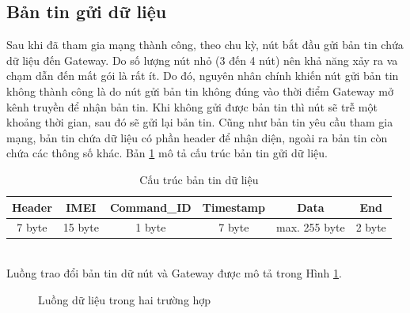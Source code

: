 \subsection{Bản tin gửi dữ liệu}
Sau khi đã tham gia mạng thành công, theo chu kỳ, nút bắt đầu gửi bản tin chứa dữ liệu đến Gateway. Do số lượng nút nhỏ (3 đến 4 nút) nên khả năng xảy ra va chạm dẫn đến mất gói là rất ít. Do đó, nguyên nhân chính khiến nút gửi bản tin không thành công là do nút gửi bản tin không đúng vào thời điểm Gateway mở kênh truyền để nhận bản tin. Khi không gửi được bản tin thì nút sẽ trễ một khoảng thời gian, sau đó sẽ gửi lại bản tin. Cũng như bản tin yêu cầu tham gia mạng, bản tin chứa dữ liệu có phần header để nhận diện, ngoài ra bản tin còn chứa các thông số khác. Bản \ref{construction_data} mô tả cấu trúc bản tin gửi dữ liệu.\\
\begin{table}[h]
\centering
\caption{Cấu trúc bản tin dữ liệu}
	\begin{tabular}{|c|c|c|c|c|c|}
	\hline
	Header & IMEI & Command\_ID & Timestamp & Data & End \\
	\hline
	7 byte & 15 byte & 1 byte & 7 byte & max. 255 byte & 2 byte\\
	\hline 
	\end{tabular}
	\label{construction_data}
\end{table}\\
Luồng trao đổi bản tin dữ nút và Gateway được mô tả trong Hình \ref{senddata}{}.
\begin{figure}[htp]
\label{senddata}
\hfill
{}
  \caption{Luồng dữ liệu trong hai trường hợp}
\end{figure}
